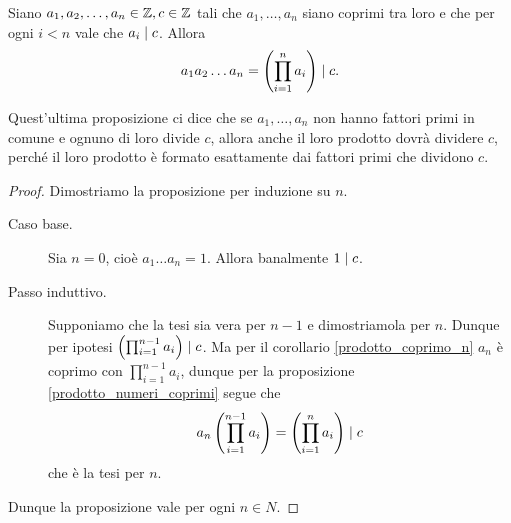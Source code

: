 \begin{proposition}
    Siano $a_1, a_2, \dots, a_n \in \mathbb{Z}, c \in \mathbb{Z}$ tali che $a_1, \dots, a_n$ siano coprimi tra loro e che per ogni $i<n$ vale che $a_i \mid c$.
    Allora \begin{equation}
        a_1a_2\dots a_n = \left( \prod_{i = 1}^n a_i \right) \mid c.
    \end{equation}
\end{proposition}
\begin{intuition}
    Quest'ultima proposizione ci dice che se $a_1, \dots, a_n$ non hanno fattori primi in comune e ognuno di loro divide $c$, allora anche il loro prodotto dovrà dividere $c$, perché il loro prodotto è formato esattamente dai fattori primi che dividono $c$.
\end{intuition}
\begin{proof}
    Dimostriamo la proposizione per induzione su $n$.
    \begin{description}
        \item[Caso base.] 
        Sia $n = 0$, cioè $a_1\dots a_n = 1$. Allora banalmente $1 \mid c$.
        \item[Passo induttivo.]         
        Supponiamo che la tesi sia vera per $n-1$ e dimostriamola per $n$. Dunque per ipotesi $ \left(\prod_{i = 1}^{n - 1} a_i\right) \mid c$.
        Ma per il corollario \ref{prodotto_coprimo_n} $a_n$ è coprimo con $\prod_{i = 1}^{n - 1} a_i$, dunque per la proposizione \ref{prodotto_numeri_coprimi} segue che
        \begin{equation*}
            a_n \left(\prod_{i = 1}^{n - 1} a_i\right) = \left( \prod_{i = 1}^{n} a_i \right) \mid c
        \end{equation*}
        che è la tesi per $n$.
    \end{description}
    Dunque la proposizione vale per ogni $n \in N$.
\end{proof}


